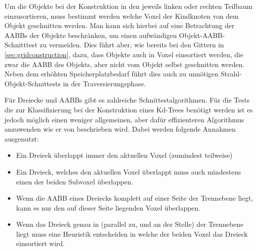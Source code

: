 Um die Objekte bei der Konstruktion in den jeweils linken oder rechten Teilbaum einzusortieren, muss bestimmt werden welche Voxel der Kindknoten von dem Objekt geschnitten werden.
Man kann sich hierbei auf eine Betrachtung der AABBs der Objekte beschränken, um einen aufwändigen Objekt-AABB-Schnitttest zu vermeiden.
Dies führt aber, wie bereits bei den Gittern in \ref{sec:gridconstruction}, dazu, dass Objekte auch in Voxel einsortiert werden, die zwar die AABB des Objekts, aber nicht vom Objekt selbst geschnitten werden. Neben dem erhöhten Speicherplatzbedarf führt dies auch zu unnötigen Strahl-Objekt-Schnittests in der Traversierungsphase.

Für Dreiecke und AABBs gibt es zahlreiche Schnittestalgorithmen. Für die Tests die zur Klassifizierung bei der Konstruktion eines Kd-Trees benötigt werden ist es jedoch möglich einen weniger allgemeinen, aber dafür effizienteren Algorithmus anzuwenden wie er von \cite{Waechter08} beschrieben wird. 
Dabei werden folgende Annahmen ausgenutzt:
\begin{itemize}
 \item Ein Dreieck überlappt immer den aktuellen Voxel (zumindest teilweise)
 \item Ein Dreieck, welches den aktuellen Voxel überlappt muss auch mindestens einen der beiden Subvoxel überlappen.
 \item Wenn die AABB eines Dreiecks komplett auf einer Seite der Trennebene liegt, kann es nur den auf dieser Seite liegenden Voxel überlappen.
 \item Wenn das Dreieck genau in (parallel zu, und an der Stelle) der Trennebene liegt muss eine Heuristik entscheiden in welche der beiden Voxel das Dreieck einsortiert wird.
\end{itemize}


